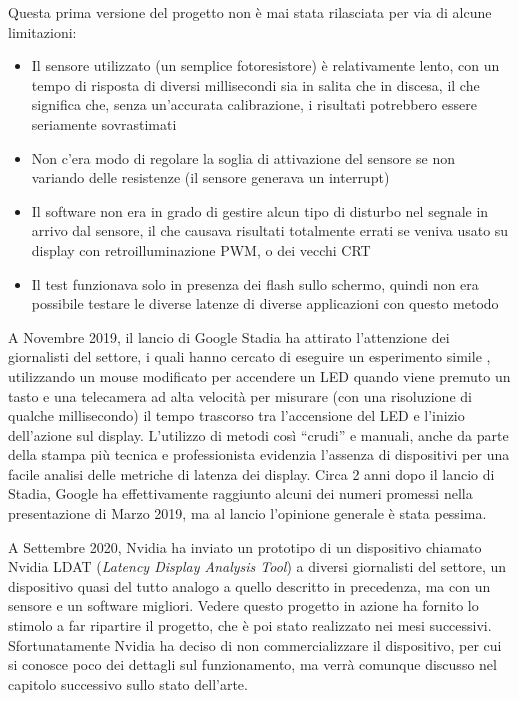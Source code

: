 Questa prima versione del progetto non è mai stata rilasciata per via di alcune limitazioni:
\begin{itemize}
	\item Il sensore utilizzato (un semplice fotoresistore) è relativamente lento\cite{adafruit_photores}, con un tempo di risposta di diversi millisecondi sia in salita che in discesa, il che significa che, senza un'accurata calibrazione, i risultati potrebbero essere seriamente sovrastimati
	\item Non c'era modo di regolare la soglia di attivazione del sensore se non variando delle resistenze (il sensore generava un interrupt)
	\item Il software non era in grado di gestire alcun tipo di disturbo nel segnale in arrivo dal sensore, il che causava risultati totalmente errati se veniva usato su display con retroilluminazione PWM, o dei vecchi CRT
	\item Il test funzionava solo in presenza dei flash sullo schermo, quindi non era possibile testare le diverse latenze di diverse applicazioni con questo metodo
\end{itemize}

A Novembre 2019, il lancio di Google Stadia ha attirato l'attenzione dei giornalisti del settore, i quali hanno cercato di eseguire un esperimento simile\cite{gamersnexus_stadia} \cite{gamersnexus_stadia2}, utilizzando un mouse modificato per accendere un LED quando viene premuto un tasto e una telecamera ad alta velocità per misurare (con una risoluzione di qualche millisecondo) il tempo trascorso tra l'accensione del LED e l'inizio dell'azione sul display. L'utilizzo di metodi così ``crudi'' e manuali, anche da parte della stampa più tecnica e professionista evidenzia l'assenza di dispositivi per una facile analisi delle metriche di latenza dei display. Circa 2 anni dopo il lancio di Stadia, Google ha effettivamente raggiunto alcuni dei numeri promessi nella presentazione di Marzo 2019, ma al lancio l'opinione generale è stata pessima.

A Settembre 2020, Nvidia ha inviato un prototipo di un dispositivo chiamato Nvidia LDAT (\textit{Latency Display Analysis Tool}) a diversi giornalisti del settore\cite{gamersnexus_nvidialdat}, un dispositivo quasi del tutto analogo a quello descritto in precedenza, ma con un sensore e un software migliori. Vedere questo progetto in azione ha fornito lo stimolo a far ripartire il progetto, che è poi stato realizzato nei mesi successivi. Sfortunatamente Nvidia ha deciso di non commercializzare il dispositivo, per cui si conosce poco dei dettagli sul funzionamento, ma verrà comunque discusso nel capitolo successivo sullo stato dell'arte.


